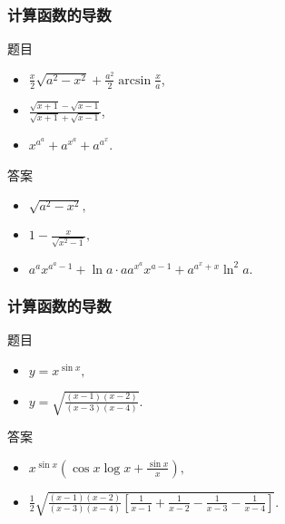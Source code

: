 \documentclass[
10pt,
aspectratio=43,
]{beamer}
\begin{document}
\begin{frame}
	\frametitle{计算函数的导数}

	\begin{block}{题目}
		\begin{itemize}
			\item $\displaystyle\frac{x}{2} \sqrt{a^2-x^2}+\frac{a^2}{2} \arcsin \frac{x}{a}$,
			\item $\displaystyle\frac{\sqrt{x+1}-\sqrt{x-1}}{\sqrt{x+1}+\sqrt{x-1}}$,
			\item $x^{a^a}+a^{x^a}+a^{a^x}$.
		\end{itemize}
	\end{block}

	\pause

	\begin{exampleblock}{答案}
		\begin{itemize}
			 \item $\displaystyle \sqrt{a^2-x^2},$
			 \item $\displaystyle1-\frac{x}{\sqrt{x^2-1}},$
			 \item $\displaystyle a^a x^{a^a-1}+\ln a \cdot aa^{x^a}  x^{a-1}+a^{a^x+x}\ln^2 a.$
		\end{itemize}
	\end{exampleblock}

\end{frame}

\begin{frame}
	\frametitle{计算函数的导数}

	\begin{block}{题目}
		\begin{itemize}
			\item $y=x^{\sin x},$
			\item $\displaystyle y=\sqrt{\frac{(x-1)(x-2)}{(x-3)(x-4)}}$.
		\end{itemize}
	\end{block}

	\pause

	\begin{exampleblock}{答案}
		\begin{itemize}
			\item $\displaystyle x^{\sin x}\left(\cos x \log x + \frac{\sin x}{x}\right),$
			\item $\displaystyle  \frac{1}{2} \sqrt{\frac{(x-1)(x-2)}{(x-3)(x-4)}\left[\frac{1}{x-1}+\frac{1}{x-2}-\frac{1}{x-3}-\frac{1}{x-4}\right]}.$
		\end{itemize}
	\end{exampleblock}

\end{frame}
\end{document}
